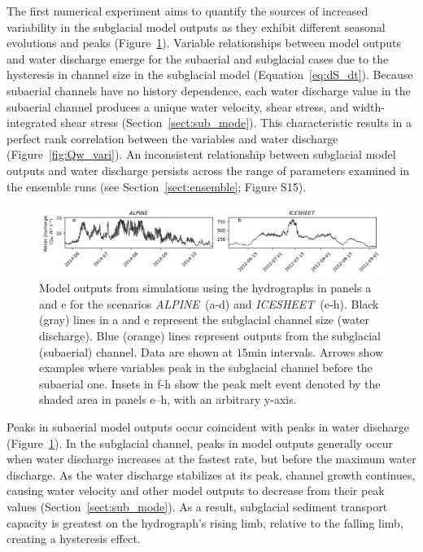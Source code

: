 \documentclass[tc, manuscript]{copernicus}
\newcommand{\alpine}{\textit{ALPINE}\,}
\newcommand{\icesheet}{\textit{ICESHEET}\,}
\begin{document}
The first numerical experiment aims to quantify the sources of increased variability in the subglacial model outputs as they exhibit different seasonal evolutions and peaks (Figure~\ref{fig:model_outs}).
Variable relationships between model outputs and water discharge emerge for the subaerial and subglacial cases due to the hysteresis in channel size in the subglacial model (Equation~\ref{eq:dS_dt}).
Because subaerial channels have no history dependence, each water discharge value in the subaerial channel produces a unique water velocity, shear stress, and width-integrated shear stress (Section~\ref{sect:sub_mode}).
This characteristic results in a perfect rank correlation between the variables and water discharge (Figure~\ref{fig:Qw_vari}).
An inconsistent relationship between subglacial model outputs and water discharge persists across the range of parameters examined in the ensemble runs (see Section~\ref{sect:ensemble}; Figure S15).
\begin{figure}[hbt!]
  \centering
  \includegraphics[width=\linewidth]{Fig2.png}
  \caption{Model outputs from simulations using the hydrographs in panels a and e for the scenarios \alpine{} (a-d) and \icesheet{} (e-h).
    Black (gray) lines in a and e represent the subglacial channel size (water discharge).
    Blue (orange) lines represent outputs from the subglacial (subaerial) channel.
    Data are shown at $15$\unit{min} intervals.
    Arrows show examples where variables peak in the subglacial channel before the subaerial one.
    Insets in f-h show the peak melt event denoted by the shaded area in panels e--h, with an arbitrary y-axis.
  }
  \label{fig:model_outs}
\end{figure}

Peaks in subaerial model outputs occur coincident with peaks in water discharge (Figure~\ref{fig:model_outs}).
In the subglacial channel, peaks in model outputs generally occur when water discharge increases at the fastest rate, but before the maximum water discharge.
As the water discharge stabilizes at its peak, channel growth continues, causing water velocity and other model outputs to decrease from their peak values (Section~\ref{sect:sub_mode}).
As a result, subglacial sediment transport capacity is greatest on the hydrograph's rising limb, relative to the falling limb, creating a hysteresis effect.
\end{document}
